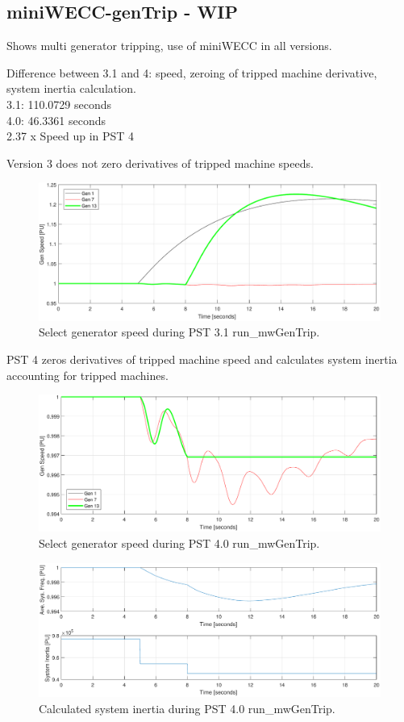 \subsection{miniWECC-genTrip - WIP} 
Shows multi generator tripping, use of miniWECC in all versions.

Difference between 3.1 and 4: speed, zeroing of tripped machine derivative, system inertia calculation.\\
3.1: 110.0729 seconds\\
4.0: 46.3361 seconds\\
2.37 x Speed up in PST 4

Version 3 does not zero derivatives of tripped machine speeds.
\begin{figure}[H]
	\centering
	\footnotesize
	\includegraphics[width=\linewidth]{examples/miniWECC/mwGenTrip-3-Speed}
	\caption{Select generator speed during PST 3.1 run\_mwGenTrip.}
	\label{fig: mwGenTrip 3 speed}
\end{figure}%

\pagebreak
PST 4 zeros derivatives of tripped machine speed and calculates system inertia accounting for tripped machines.
\begin{figure}[H]
	\centering
	\footnotesize
	\includegraphics[width=\linewidth]{examples/miniWECC/mwGenTrip-4-Speed}
	\caption{Select generator speed during PST 4.0 run\_mwGenTrip.}
	\label{fig: mwGenTrip 4 speed}
\end{figure}%

\begin{figure}[H]
	\centering
	\footnotesize
	\includegraphics[width=\linewidth]{examples/miniWECC/mwGenTrip-4-FandH}
	\caption{Calculated system inertia during PST 4.0 run\_mwGenTrip.}
	\label{fig: mwGenTrip 4 FandH}
\end{figure}%